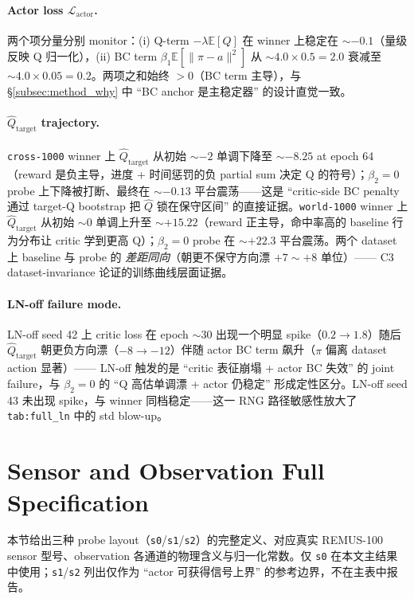 \paragraph{Actor loss $\mathcal{L}_{\text{actor}}$.}\quad
两个项分量分别 monitor：(i) Q-term $-\lambda \mathbb{E}[Q]$ 在 winner 上稳定在 $\sim -0.1$（量级反映 Q 归一化），(ii) BC term $\beta_1 \mathbb{E}[\|\pi - a\|^2]$ 从 $\sim 4.0 \times 0.5 = 2.0$ 衰减至 $\sim 4.0 \times 0.05 = 0.2$。两项之和始终 $> 0$（BC term 主导），与 \S\ref{subsec:method_why} 中 ``BC anchor 是主稳定器'' 的设计直觉一致。

\paragraph{$\hat{Q}_{\text{target}}$ trajectory.}\quad
\texttt{cross-1000} winner 上 $\hat{Q}_{\text{target}}$ 从初始 $\sim -2$ 单调下降至 $\sim -8.25$ at epoch 64（reward 是负主导，进度 + 时间惩罚的负 partial sum 决定 Q 的符号）；$\beta_2\!=\!0$ probe 上下降被打断、最终在 $\sim -0.13$ 平台震荡——这是 ``critic-side BC penalty 通过 target-Q bootstrap 把 $\hat{Q}$ 锁在保守区间'' 的直接证据。\texttt{world-1000} winner 上 $\hat{Q}_{\text{target}}$ 从初始 $\sim 0$ 单调上升至 $\sim +15.22$（reward 正主导，命中率高的 baseline 行为分布让 critic 学到更高 Q）；$\beta_2\!=\!0$ probe 在 $\sim +22.3$ 平台震荡。两个 dataset 上 baseline 与 probe 的 \emph{差距同向}（朝更不保守方向漂 $+7\sim+8$ 单位）—— C3 dataset-invariance 论证的训练曲线层面证据。

\paragraph{LN-off failure mode.}\quad
LN-off seed 42 上 critic loss 在 epoch $\sim 30$ 出现一个明显 spike（$0.2 \to 1.8$）随后 $\hat{Q}_{\text{target}}$ 朝更负方向漂（$-8 \to -12$）伴随 actor BC term 飙升（$\pi$ 偏离 dataset action 显著）—— LN-off 触发的是 ``critic 表征崩塌 + actor BC 失效'' 的 joint failure，与 $\beta_2\!=\!0$ 的 ``Q 高估单调漂 + actor 仍稳定'' 形成定性区分。LN-off seed 43 未出现 spike，与 winner 同档稳定——这一 RNG 路径敏感性放大了 \texttt{tab:full\_ln} 中的 std blow-up。

\section{Sensor and Observation Full Specification}\label{app:obs_spec}

本节给出三种 probe layout（\texttt{s0}/\texttt{s1}/\texttt{s2}）的完整定义、对应真实 REMUS-100 sensor 型号、observation 各通道的物理含义与归一化常数。仅 \texttt{s0} 在本文主结果中使用；\texttt{s1}/\texttt{s2} 列出仅作为 ``actor 可获得信号上界'' 的参考边界，不在主表中报告。

